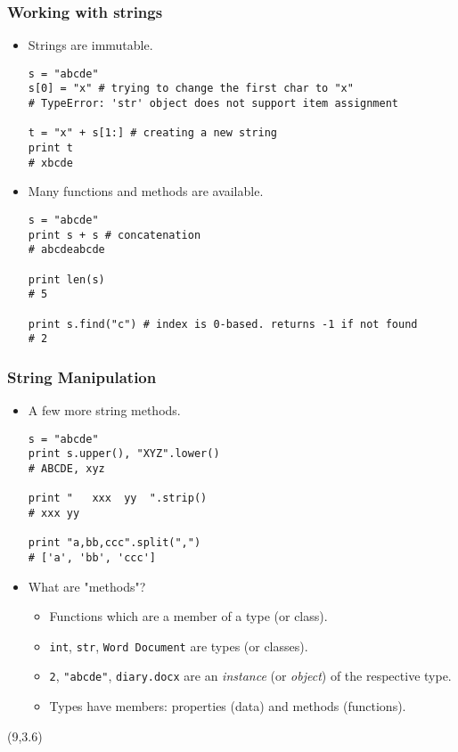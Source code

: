 \documentclass{beamer}
\begin{document}
\begin{frame}[fragile]
\frametitle{Working with strings}
\begin{itemize}
\item Strings are immutable.
\begin{lstlisting}
s = "abcde"
s[0] = "x" # trying to change the first char to "x"
# TypeError: 'str' object does not support item assignment

t = "x" + s[1:] # creating a new string
print t
# xbcde
\end{lstlisting} 
\item Many functions and methods are available. 
\begin{lstlisting}
s = "abcde"
print s + s # concatenation 
# abcdeabcde

print len(s)
# 5

print s.find("c") # index is 0-based. returns -1 if not found
# 2
\end{lstlisting} 
\end{itemize}
\end{frame}

\begin{frame}[fragile]
\frametitle{String Manipulation}
\begin{itemize}
\item<1-> A few more string methods.
\begin{lstlisting}
s = "abcde"
print s.upper(), "XYZ".lower()
# ABCDE, xyz

print "   xxx  yy  ".strip()
# xxx yy

print "a,bb,ccc".split(",")
# ['a', 'bb', 'ccc']
\end{lstlisting}
\item<2-> What are "methods"?
\begin{itemize}
\item<3-> Functions which are a member of a type (or class).
\item<4-> \lstinline{int}, \lstinline{str}, \lstinline{Word Document}
          are types (or classes).
\item<4-> \lstinline{2}, \lstinline{"abcde"}, \lstinline{diary.docx}
          are an \emph{instance} (or \emph{object}) of the
          respective type.
\item<4-> Types have members: properties (data) and methods (functions).
\end{itemize}
\end{itemize}

\begin{textblock}{5}(9,3.6)
\end{textblock}

\end{frame}
\end{document}
